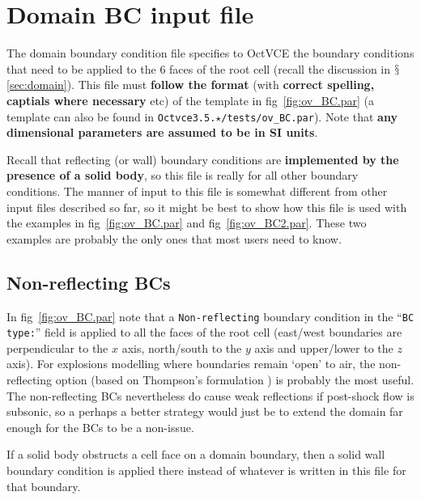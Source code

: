 \documentclass[pdftex, 12pt, a4paper]{report}
\begin{document}
\section{Domain BC input file}\label{sec:ov_BC}

The domain boundary condition file specifies to OctVCE the boundary conditions that need to be applied to the 6 faces
of the root cell (recall the discussion in $\mathsection$\ref{sec:domain}).  This file must \textbf{follow the format} (with 
\textbf{correct spelling, captials where necessary} etc) of the template in
fig~\ref{fig:ov_BC.par} (a template can also be found in \verb'Octvce3.5.'$\star$\verb'/tests/ov_BC.par').  Note 
that \textbf{any dimensional parameters are assumed to be in SI units}.  

Recall that reflecting (or wall) boundary conditions are \textbf{implemented by the presence of a solid body}, so this file
is really for all other boundary conditions.
The manner of input to this file is somewhat different from other input files described so far, so it might be best to show how this
file is used with the examples in fig~\ref{fig:ov_BC.par} and 
fig~\ref{fig:ov_BC2.par}.  These two examples are probably the only ones that most users need to know.

\subsection{Non-reflecting BCs}\label{sec:non-reflect}

In fig~\ref{fig:ov_BC.par} note that a \verb'Non-reflecting' boundary condition in the ``\verb'BC type:''' field is applied to all 
the faces 
of the root cell (east/west boundaries are perpendicular to the $x$ axis, north/south to the $y$ axis and upper/lower to 
the $z$ axis).  For explosions modelling where boundaries remain `open' to air, the non-reflecting option (based on Thompson's 
formulation \cite{Thompson:bcs}) is probably the most useful.
The non-reflecting BCs nevertheless do cause weak reflections if post-shock flow is subsonic, so a perhaps a better strategy
would just be to extend the domain far enough for the BCs to be a non-issue.

If a solid body obstructs a cell face on a domain boundary, then a solid wall boundary condition is applied there instead of 
whatever is written in this file for that boundary.
\end{document}

